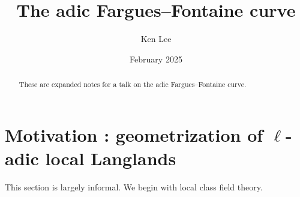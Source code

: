 \documentclass{article}
\begin{document}
\title{The adic Fargues--Fontaine curve}

\author{Ken Lee}
\date{February 2025}
\maketitle

\begin{abstract}
  These are expanded notes for a talk on the adic Fargues--Fontaine curve.
\end{abstract}

\tableofcontents

\section{Motivation : geometrization of $\ell$-adic local Langlands}

This section is largely informal.
We begin with local class field theory.
\end{document}
